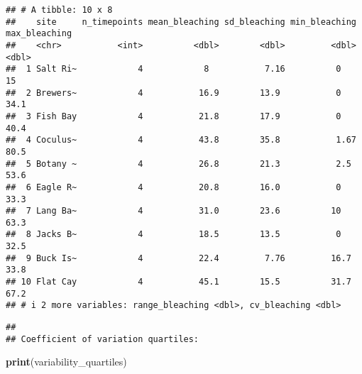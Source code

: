 \documentclass[
]{article}
\newenvironment{Shaded}{\begin{snugshade}}{\end{snugshade}}
\newcommand{\AttributeTok}[1]{\textcolor[rgb]{0.13,0.29,0.53}{#1}}
\newcommand{\CommentTok}[1]{\textcolor[rgb]{0.56,0.35,0.01}{\textit{#1}}}
\newcommand{\ConstantTok}[1]{\textcolor[rgb]{0.56,0.35,0.01}{#1}}
\newcommand{\DecValTok}[1]{\textcolor[rgb]{0.00,0.00,0.81}{#1}}
\newcommand{\FloatTok}[1]{\textcolor[rgb]{0.00,0.00,0.81}{#1}}
\newcommand{\FunctionTok}[1]{\textcolor[rgb]{0.13,0.29,0.53}{\textbf{#1}}}
\newcommand{\NormalTok}[1]{#1}
\newcommand{\OtherTok}[1]{\textcolor[rgb]{0.56,0.35,0.01}{#1}}
\newcommand{\SpecialCharTok}[1]{\textcolor[rgb]{0.81,0.36,0.00}{\textbf{#1}}}
\newcommand{\StringTok}[1]{\textcolor[rgb]{0.31,0.60,0.02}{#1}}
\begin{document}
\begin{verbatim}
## # A tibble: 10 x 8
##    site     n_timepoints mean_bleaching sd_bleaching min_bleaching max_bleaching
##    <chr>           <int>          <dbl>        <dbl>         <dbl>         <dbl>
##  1 Salt Ri~            4            8           7.16          0             15  
##  2 Brewers~            4           16.9        13.9           0             34.1
##  3 Fish Bay            4           21.8        17.9           0             40.4
##  4 Coculus~            4           43.8        35.8           1.67          80.5
##  5 Botany ~            4           26.8        21.3           2.5           53.6
##  6 Eagle R~            4           20.8        16.0           0             33.3
##  7 Lang Ba~            4           31.0        23.6          10             63.3
##  8 Jacks B~            4           18.5        13.5           0             32.5
##  9 Buck Is~            4           22.4         7.76         16.7           33.8
## 10 Flat Cay            4           45.1        15.5          31.7           67.2
## # i 2 more variables: range_bleaching <dbl>, cv_bleaching <dbl>
\end{verbatim}

\begin{Shaded}
\end{Shaded}

\begin{verbatim}
## 
## Coefficient of variation quartiles:
\end{verbatim}

\begin{Shaded}
\begin{Highlighting}[]
\FunctionTok{print}\NormalTok{(variability\_quartiles)}
\end{Highlighting}
\end{Shaded}
\end{document}
